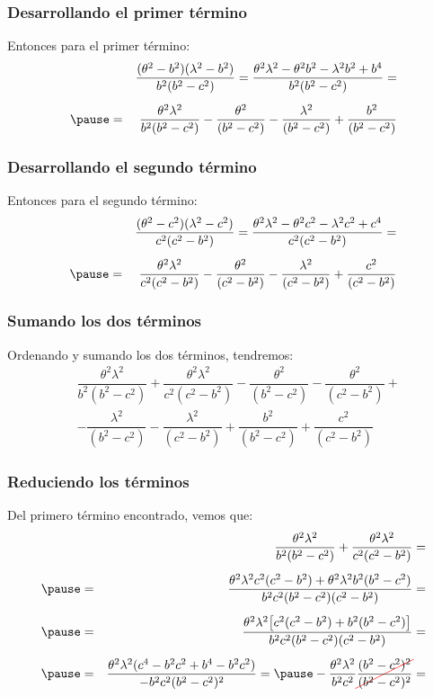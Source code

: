 \documentclass[12pt]{beamer}
\newcommand{\Cancel}[2][black]{{\color{#1}\cancel{\color{black}#2}}}
\begin{document}
\begin{frame}
\frametitle{Desarrollando el primer término}
Entonces para el primer término:
\pause
\begin{eqnarray*}
&{}&\dfrac{(\theta^{2} - b^{2})(\lambda^{2} - b^{2})}{b^{2}(b^{2} - c^{2})} = \dfrac{\theta^{2} \lambda^{2} - \theta^2 b^{2} - \lambda^{2} b^{2} + b^{4}}{b^{2}(b^{2} - c^{2})} = \\[0.5em] \pause
&=& \dfrac{\theta^{2} \lambda^{2}}{b^{2}(b^{2} - c^{2})} - \dfrac{\theta^{2}}{(b^{2} - c^{2})} - \dfrac{\lambda^{2}}{(b^{2} - c^{2})} + \dfrac{b^{2}}{(b^{2} - c^{2})}
\end{eqnarray*}
\end{frame}
\begin{frame}
\frametitle{Desarrollando el segundo término}
Entonces para el segundo término:
\pause
\begin{eqnarray*}
&{}&\dfrac{(\theta^{2} - c^{2})(\lambda^{2} - c^{2})}{c^{2}(c^{2} - b^{2})} = \dfrac{\theta^{2} \lambda^{2} - \theta^2 c^{2} - \lambda^{2} c^{2} + c^{4}}{c^{2}(c^{2} - b^{2})} = \\[0.5em] \pause
&=& \dfrac{\theta^{2} \lambda^{2}}{c^{2}(c^{2} - b^{2})} - \dfrac{\theta^{2}}{(c^{2} - b^{2})} - \dfrac{\lambda^{2}}{(c^{2} - b^{2})} + \dfrac{c^{2}}{(c^{2} - b^{2})}
\end{eqnarray*}
\end{frame}
\begin{frame}
\frametitle{Sumando los dos términos}
Ordenando y sumando los dos términos, tendremos:
\pause
\begin{align*}
&\dfrac{\theta^{2} \lambda^{2}}{b^{2}(b^{2} - c^{2})} + \dfrac{\theta^{2} \lambda^{2}}{c^{2}(c^{2} - b^{2})} - \dfrac{\theta^{2}}{(b^{2} - c^{2})} - \dfrac{\theta^{2}}{(c^{2} - b^{2})} + \\[0.5em] 
&- \dfrac{\lambda^{2}}{(b^{2} - c^{2})} - \dfrac{\lambda^{2}}{(c^{2} - b^{2})} + \dfrac{b^{2}}{(b^{2} - c^{2})} + \dfrac{c^{2}}{(c^{2} - b^{2})}
\end{align*}
\end{frame}
\begin{frame}
\frametitle{Reduciendo los términos}
Del primero término encontrado, vemos que:
\pause
\begin{eqnarray*}
&{}&\dfrac{\theta^{2} \lambda^{2}}{b^{2}(b^{2} - c^{2})} + \dfrac{\theta^{2} \lambda^{2}}{c^{2}(c^{2} - b^{2})} = \\[0.5em] \pause
&=& \dfrac{\theta^{2} \lambda^{2} c^{2} (c^{2} - b^{2}) + \theta^{2} \lambda^{2} b^{2} (b^{2} - c^{2})}{b^{2} c^{2}(b^{2} - c^{2})(c^{2} - b^{2})} = \\[0.5em] \pause
&=& \dfrac{\theta^{2} \lambda^{2} \big[ c^{2} (c^{2} - b^{2}) + b^{2} (b^{2} - c^{2}) \big]}{b^{2} c^{2}(b^{2} - c^{2})(c^{2} - b^{2})} = \\[0.5em] \pause
&=& \dfrac{\theta^{2} \lambda^{2} (c^{4} - b^{2} c^{2} + b^{4} -b^{2} c^{2})}{-b^{2} c^{2} (b^{2} - c^{2})^{2}} = \pause - \dfrac{\theta^{2} \lambda^{2}}{b^{2} c^{2}} \Cancel[red]{\dfrac{(b^{2} - c^{2})^{2}}{(b^{2} - c^{2})^{2}}} =
\end{eqnarray*}
\end{frame}
\end{document}
